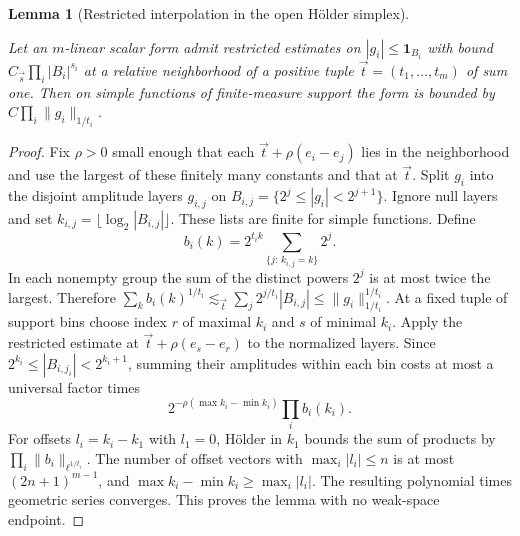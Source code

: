 \documentclass[11pt,letterpaper]{article}
\newtheorem{lemma}[theorem]{Lemma}
\theoremstyle{definition}
\newcommand{\ind}{\mathbf1}
\newcommand{\norm}[1]{\lVert#1\rVert}
\providecommand{\lean}[1]{}
\begin{document}
\begin{lemma}[Restricted interpolation in the open H\"older simplex]
\label{bp:interp}
\lean{TwistedParaproduct.interp}
Let an \(m\)-linear scalar form admit restricted estimates on
\(|g_i|\le\ind_{B_i}\) with bound \(C_{\vec s}\prod_i |B_i|^{s_i}\)
at a relative neighborhood of a positive tuple
\(\vec t=(t_1,\ldots,t_m)\) of sum one. Then on simple functions of
finite-measure support the form is bounded by
\(C\prod_i\norm{g_i}_{1/t_i}\).
\end{lemma}
\begin{proof}
Fix \(\rho>0\) small enough that each
\(\vec t+\rho(e_i-e_j)\) lies in the neighborhood and use the largest
of these finitely many constants and that at \(\vec t\).
Split \(g_i\) into the disjoint amplitude layers \(g_{i,j}\) on
\(B_{i,j}=\{2^j\le |g_i|<2^{j+1}\}\). Ignore null layers and set
\(k_{i,j}=\lfloor\log_2 |B_{i,j}|\rfloor\). These lists are finite
for simple functions. Define
\[
  b_i(k)=2^{t_i k}\sum_{\{j:\,k_{i,j}=k\}}2^j.
\]
In each nonempty group the sum of the distinct powers \(2^j\)
is at most twice the largest. Therefore
\(\sum_k b_i(k)^{1/t_i}\lesssim_{\vec t}
\sum_j2^{j/t_i}|B_{i,j}|\le\norm{g_i}_{1/t_i}^{1/t_i}\).
At a fixed tuple of support bins choose index \(r\) of maximal \(k_i\)
and \(s\) of minimal \(k_i\). Apply the restricted estimate at
\(\vec t+\rho(e_s-e_r)\) to the normalized layers.
Since \(2^{k_i}\le |B_{i,j_i}|<2^{k_i+1}\), summing their amplitudes
within each bin costs at most a universal factor times
\[
              2^{-\rho(\max k_i-\min k_i)}\prod_i b_i(k_i).
\]
For offsets \(l_i=k_i-k_1\) with \(l_1=0\), H\"older in \(k_1\) bounds
the sum of products by \(\prod_i\norm{b_i}_{\ell^{1/t_i}}\).
The number of offset vectors with \(\max_i|l_i|\le n\) is at most
\((2n+1)^{m-1}\), and \(\max k_i-\min k_i\ge\max_i|l_i|\).
The resulting polynomial times geometric series converges. This proves
the lemma with no weak-space endpoint.
\end{proof}
\end{document}
